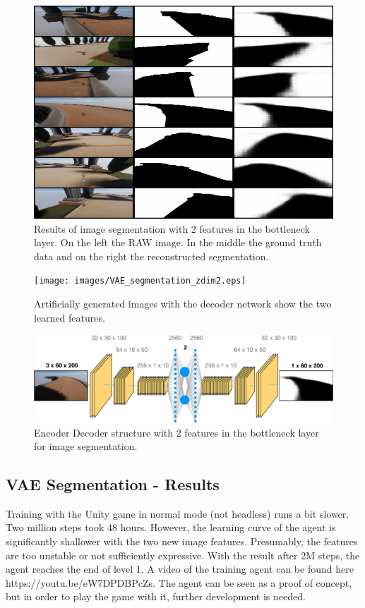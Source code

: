 \documentclass[conference]{IEEEtran}
\begin{document}
\begin{figure}[!t]
  \centering
  \includegraphics[width=1.0\linewidth]{images/segmentation.png}
  \caption{Results of image segmentation with 2 features in the bottleneck layer. On the left the RAW image. In the middle the ground truth data and on the right the reconstructed segmentation.}
\label{fig:segmentation}
\end{figure}

\begin{figure}[!t]
  \centering
  \texttt{[image: images/VAE\_segmentation\_zdim2.eps]}
  \caption{Artificially generated images with the decoder network show the two learned features.}
\label{fig:segmentation-decoder}
\end{figure}

\begin{figure}[!t]
  \centering
  \includegraphics[width=1.0\linewidth]{images/VAE_Segmentation.eps}
  \caption{Encoder Decoder structure with 2 features in the bottleneck layer for image segmentation.}
\label{fig:segmentation_encoder-decoder}
\end{figure}

\subsection{VAE Segmentation - Results}
Training with the Unity game in normal mode (not headless) runs a bit slower. Two million steps took 48 hours. However, the learning curve of the agent is significantly shallower with the two new image features. Presumably, the features are too unstable or not sufficiently expressive. With the result after 2M steps, the agent reaches the end of level 1. A video of the training agent can be found here  https://youtu.be/eW7DPDBPcZs. The agent can be seen as a proof of concept, but in order to play the game with it, further development is needed.
\end{document}

